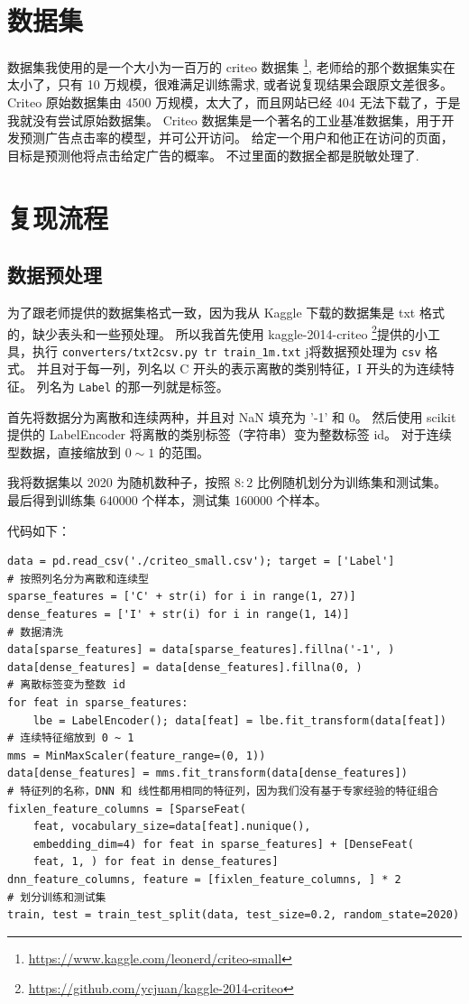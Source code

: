 \documentclass[degree=project,degree-type=project,cjk-font=noto]{thuthesis}
\begin{document}
\chapter{数据集}

数据集我使用的是一个大小为一百万的 criteo 数据集 \footnote{\url{https://www.kaggle.com/leonerd/criteo-small}}, 老师给的那个数据集实在太小了，只有 10 万规模，很难满足训练需求, 或者说复现结果会跟原文差很多。
Criteo 原始数据集由 4500 万规模，太大了，而且网站已经 404 无法下载了，于是我就没有尝试原始数据集。
Criteo 数据集是一个著名的工业基准数据集，用于开发预测广告点击率的模型，并可公开访问。 给定一个用户和他正在访问的页面，目标是预测他将点击给定广告的概率。
不过里面的数据全都是脱敏处理了.


\chapter{复现流程}

\section{数据预处理}

为了跟老师提供的数据集格式一致，因为我从 Kaggle 下载的数据集是 txt 格式的，缺少表头和一些预处理。
所以我首先使用 kaggle-2014-criteo \footnote{\url{https://github.com/ycjuan/kaggle-2014-criteo}}提供的小工具，执行 \texttt{converters/txt2csv.py tr train\_1m.txt} j将数据预处理为 \texttt{csv} 格式。
并且对于每一列，列名以 C 开头的表示离散的类别特征，I 开头的为连续特征。
列名为 \texttt{Label} 的那一列就是标签。

首先将数据分为离散和连续两种，并且对 NaN 填充为 '-1' 和 0。
然后使用 scikit 提供的 LabelEncoder 将离散的类别标签（字符串）变为整数标签 id。
对于连续型数据，直接缩放到 $0 \sim 1$ 的范围。

我将数据集以 2020 为随机数种子，按照 $8 : 2$ 比例随机划分为训练集和测试集。
最后得到训练集 640000 个样本，测试集 160000 个样本。

代码如下：

  \begin{verbatim}
data = pd.read_csv('./criteo_small.csv'); target = ['Label']
# 按照列名分为离散和连续型
sparse_features = ['C' + str(i) for i in range(1, 27)]
dense_features = ['I' + str(i) for i in range(1, 14)]
# 数据清洗
data[sparse_features] = data[sparse_features].fillna('-1', )
data[dense_features] = data[dense_features].fillna(0, )
# 离散标签变为整数 id
for feat in sparse_features:
    lbe = LabelEncoder(); data[feat] = lbe.fit_transform(data[feat])
# 连续特征缩放到 0 ~ 1
mms = MinMaxScaler(feature_range=(0, 1))
data[dense_features] = mms.fit_transform(data[dense_features])
# 特征列的名称，DNN 和 线性都用相同的特征列，因为我们没有基于专家经验的特征组合
fixlen_feature_columns = [SparseFeat(
    feat, vocabulary_size=data[feat].nunique(),
    embedding_dim=4) for feat in sparse_features] + [DenseFeat(
    feat, 1, ) for feat in dense_features]
dnn_feature_columns, feature = [fixlen_feature_columns, ] * 2
# 划分训练和测试集
train, test = train_test_split(data, test_size=0.2, random_state=2020)
  \end{verbatim}
\end{document}
